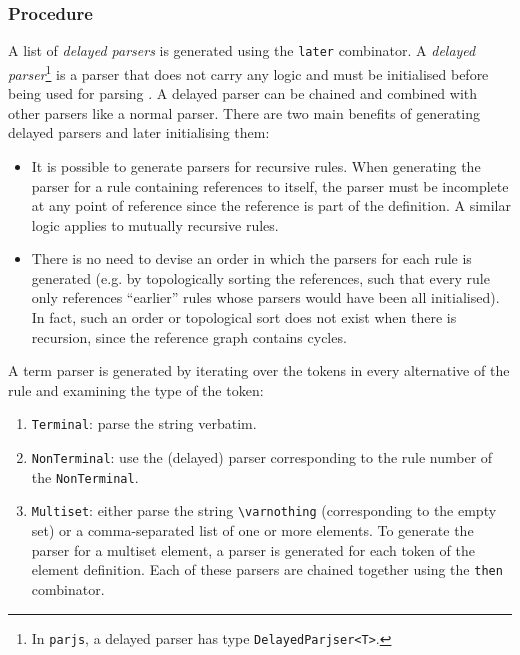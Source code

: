 \subsubsection{Procedure}
\label{term:procedure}
A list of \textit{delayed parsers} is generated using the \lstinline{later} combinator. A \textit{delayed parser}\footnote{In \lstinline{parjs}, a delayed parser has type \lstinline{DelayedParjser<T>}.} is a parser that does not carry any logic and must be initialised before being used for parsing \cite{parjs}. A delayed parser can be chained and combined with other parsers like a normal parser. There are two main benefits of generating delayed parsers and later initialising them:
\begin{itemize}
    \item It is possible to generate parsers for recursive rules. When generating the parser for a rule containing references to itself, the parser must be incomplete at any point of reference since the reference is part of the definition. A similar logic applies to mutually recursive rules.
    \item There is no need to devise an order in which the parsers for each rule is generated (e.g. by topologically sorting the references, such that every rule only references ``earlier'' rules whose parsers would have been all initialised). In fact, such an order or topological sort does not exist when there is recursion, since the reference graph contains cycles.
\end{itemize}
A term parser is generated by iterating over the tokens in every alternative of the rule and examining the type of the token:
\begin{enumerate}
    \item \lstinline{Terminal}: parse the string verbatim.
    \item \lstinline{NonTerminal}: use the (delayed) parser corresponding to the rule number of the \lstinline{NonTerminal}.
    \item \lstinline{Multiset}: either parse the string \lstinline{\varnothing} (corresponding to the empty set) or a comma-separated list of one or more elements. To generate the parser for a multiset element, a parser is generated for each token of the element definition. Each of these parsers are chained together using the \lstinline{then} combinator.
\end{enumerate}